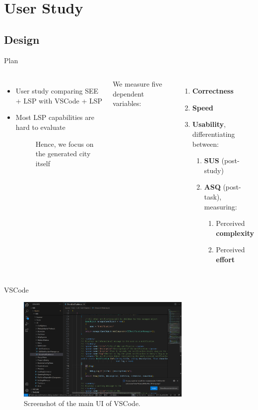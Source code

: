 \documentclass[xcolor={dvipsnames},aspectratio=169,compress]{beamer} %
\newcommand{\follows}{\raisebox{-0.7mm}{\scalebox{1.4}{\textcolor{Maroon}{\ding{43}}}}}
\newcommand{\answer}[1]{\begin{description}\item[\follows{}]{#1}\end{description}}
\begin{document}
\section{User Study}

\subsection{Design}

\begin{frame}{Plan}
	\begin{columns}
		\begin{itemize}
			\item User study comparing SEE + LSP with VSCode + LSP
			\item Most LSP capabilities are hard to evaluate
			      \answer{\small Hence, we focus on the generated city itself}
		\end{itemize}

		We measure five dependent variables:
		\begin{enumerate}
			\item \textbf{Correctness}
			\item \textbf{Speed}
			\item \textbf{Usability}, differentiating between:
			      \begin{enumerate}
				      \item \textbf{SUS} (post-study)
				      \item \textbf{ASQ} (post-task), measuring:
				            \begin{enumerate}
					            \item Perceived \textbf{complexity}
					            \item Perceived \textbf{effort}
				            \end{enumerate}
			      \end{enumerate}
		\end{enumerate}
	\end{columns}
\end{frame}

\begin{frame}{VSCode}
	\begin{figure}
		\begin{center}
			\includegraphics[width=0.75\textwidth]{figures/VSCode.png}
		\end{center}
		\caption{Screenshot of the main UI of VSCode.}
	\end{figure}

\end{frame}
\end{document}

